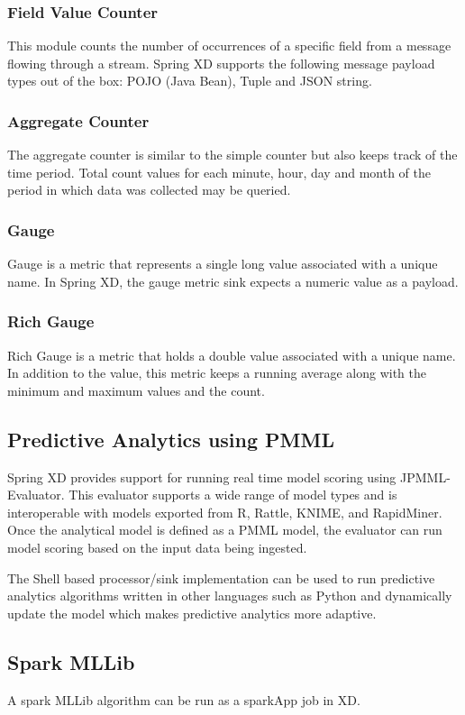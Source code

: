 \subsubsection {Field Value Counter}

This module counts the number of occurrences of a specific field from a message
flowing through a stream. Spring XD supports the following message payload types
out of the box: POJO (Java Bean), Tuple and JSON string.

\subsubsection {Aggregate Counter}

The aggregate counter is similar to the simple counter but also keeps track of
the time period. Total count values for each minute, hour, day and month
of the period in which data was collected may be queried.

\subsubsection {Gauge}
Gauge is a metric that represents a single long value associated with a unique name.
In Spring XD, the gauge metric sink expects a numeric value as a payload.

\subsubsection {Rich Gauge}
Rich Gauge is a metric that holds a double value associated with a unique name. In
addition to the value, this metric keeps a running average along with the minimum and
maximum values and the count.

\subsection {Predictive Analytics using PMML}
Spring XD provides support for running real time model scoring using JPMML-Evaluator.
This evaluator supports a wide range of model types and is interoperable with
models exported from R, Rattle, KNIME, and RapidMiner. Once the analytical model
is defined as a PMML model, the evaluator can run model scoring based on the 
input data being ingested.

\par

The Shell based processor/sink implementation can be used to run predictive
analytics algorithms written in other languages such as Python and dynamically
update the model which makes predictive analytics more adaptive.

\subsection{Spark MLLib}
A spark MLLib algorithm can be run as a sparkApp job in XD.

